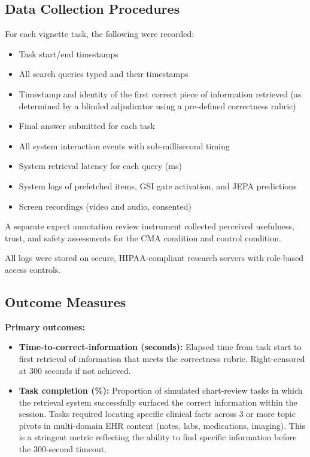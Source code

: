 \documentclass[preprint,12pt]{elsarticle}
\begin{document}
\subsection{Data Collection Procedures}

For each vignette task, the following were recorded:
\begin{itemize}
  \item Task start/end timestamps
  \item All search queries typed and their timestamps
  \item Timestamp and identity of the first correct piece of information retrieved (as determined by a blinded adjudicator using a pre-defined correctness rubric)
  \item Final answer submitted for each task
  \item All system interaction events with sub-millisecond timing
  \item System retrieval latency for each query (ms)
  \item System logs of prefetched items, GSI gate activation, and JEPA predictions
  \item Screen recordings (video and audio, consented)
\end{itemize}

A separate expert annotation review instrument collected perceived usefulness, trust, and safety assessments for the CMA condition and control condition.

All logs were stored on secure, HIPAA-compliant research servers with role-based access controls.

\subsection{Outcome Measures}

\textbf{Primary outcomes:}
\begin{itemize}
  \item \textbf{Time-to-correct-information (seconds):} Elapsed time from task start to first retrieval of information that meets the correctness rubric. Right-censored at 300 seconds if not achieved.
  \item \textbf{Task completion (\%):} Proportion of simulated chart-review tasks in which the retrieval system successfully surfaced the correct information within the session. Tasks required locating specific clinical facts across 3 or more topic pivots in multi-domain EHR content (notes, labs, medications, imaging). This is a stringent metric reflecting the ability to find specific information before the 300-second timeout.
\end{itemize}
\end{document}
